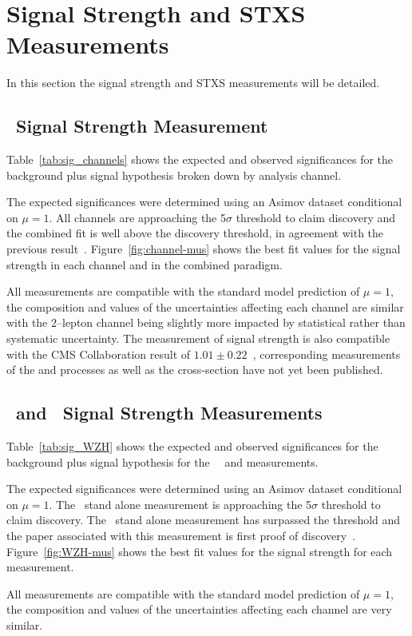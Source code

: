\clearpage

\section{Signal Strength and STXS Measurements}
In this section the signal strength and STXS measurements will be detailed.

\subsection{\VH\ Signal Strength Measurement}
Table~\ref{tab:sig_channels} shows the expected and observed significances for
the background plus signal hypothesis broken down by analysis channel.

The expected significances were determined using an Asimov dataset conditional
on $\mu=1$. All channels are approaching the 5$\sigma$ threshold to claim
discovery and the combined fit is well above the discovery threshold, in
agreement with the previous result~\cite{vhbb-obs}. Figure~\ref{fig:channel-mus}
shows the best fit values for the signal strength in each channel and in the
combined paradigm.

All measurements are compatible with the standard model prediction of $\mu=1$,
the composition and values of the uncertainties affecting each channel are
similar with the 2--lepton channel being slightly more impacted by statistical
rather than systematic uncertainty. The measurement of \VH signal strength is
also compatible with the CMS Collaboration result of $1.01 \pm
0.22$~\cite{CMS:hbb}, corresponding measurements of the \WH and \ZH processes as
well as the cross-section have not yet been published. 
% 
\clearpage
\subsection{\WH\ and \ZH\ Signal Strength Measurements}
Table~\ref{tab:sig_WZH} shows the expected and observed significances for
the background plus signal hypothesis for the \WH\, \ZH\ and \VH measurements.

The expected significances were determined using an Asimov dataset conditional
on $\mu=1$. The \WH\ stand alone measurement is approaching the 5$\sigma$
threshold to claim discovery. The \ZH\ stand alone measurement has surpassed the
threshold and the paper associated with this measurement is first proof of
discovery~\cite{final-paper}. Figure~\ref{fig:WZH-mus} shows the best fit values
for the signal strength for each measurement.

All measurements are compatible with the standard model prediction of $\mu=1$,
the composition and values of the uncertainties affecting each channel are very
similar.
\clearpage


